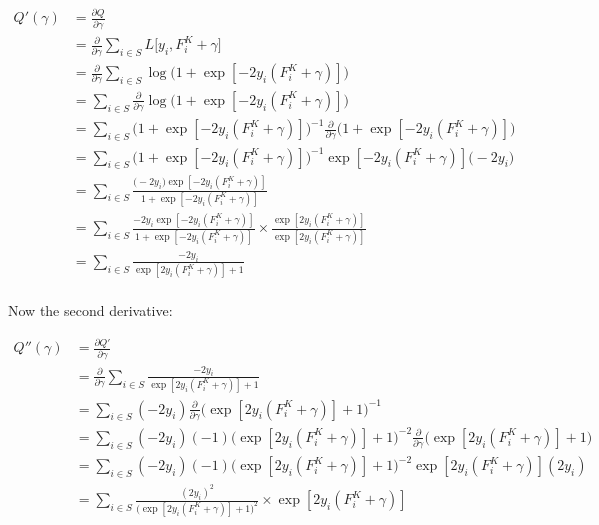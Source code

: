 \documentclass{article}
\begin{document}
\begin{equation*}
\begin{split}
Q'(\gamma) &= \frac {\partial Q}{\partial \gamma} \\
&= \frac{\partial}{\partial \gamma} \sum_{i \in S} L \bigg[ y_i, F_i^K + \gamma \bigg] \\
&= \frac{\partial}{\partial \gamma} \sum_{i \in S} \log \big( 1 + \exp [ -2 y_i (F_i^K + \gamma) ] \big) \\
&= \sum_{i \in S} \frac{\partial}{\partial \gamma} \log \big( 1 + \exp [ -2 y_i (F_i^K + \gamma) ] \big) \\
&= \sum_{i \in S} \big( 1 + \exp [ -2 y_i (F_i^K + \gamma) ] \big)^{-1} \frac{\partial}{\partial \gamma} \big( 1 + \exp [ -2 y_i (F_i^K + \gamma) ] \big) \\
&= \sum_{i \in S} \big( 1 + \exp [ -2 y_i (F_i^K + \gamma) ] \big)^{-1}  \exp [ -2 y_i (F_i^K + \gamma) ] \big( -2 y_i \big) \\
&= \sum_{i \in S} \frac{  \big( -2 y_i \big) \exp [ -2 y_i (F_i^K + \gamma) ] } { 1 + \exp [ -2 y_i (F_i^K + \gamma) ] } \\
&= \sum_{i \in S} \frac{  -2 y_i \exp [ -2 y_i (F_i^K + \gamma) ] } { 1 + \exp [ -2 y_i (F_i^K + \gamma) ] } \times
   \frac { \exp [ 2 y_i (F_i^K + \gamma) ] } { \exp [ 2 y_i (F_i^K + \gamma) ] } \\
&= \sum_{i \in S} \frac{ -2 y_i } { \exp [ 2 y_i (F_i^K + \gamma) ] + 1 } \\
\end{split}
\end{equation*}

Now the second derivative:

\begin{equation*}
\begin{split}
Q''(\gamma) &= \frac {\partial Q'}{\partial \gamma} \\
&= \frac {\partial}{\partial \gamma} \sum_{i \in S} \frac{ -2 y_i } { \exp [ 2 y_i (F_i^K + \gamma) ] + 1 } \\
&= \sum_{i \in S} (-2 y_i ) \frac {\partial}{\partial \gamma} \bigg( \exp [ 2 y_i (F_i^K + \gamma) ] + 1 \bigg)^{-1} \\
&= \sum_{i \in S} (-2 y_i ) (-1) \bigg( \exp [ 2 y_i (F_i^K + \gamma) ] + 1 \bigg)^{-2} \frac {\partial}{\partial \gamma} \bigg( \exp [ 2 y_i (F_i^K + \gamma) ] + 1 \bigg) \\
&= \sum_{i \in S} (-2 y_i ) (-1) \bigg( \exp [ 2 y_i (F_i^K + \gamma) ] + 1 \bigg)^{-2} \exp [ 2 y_i (F_i^K + \gamma) ] ( 2 y_i ) \\
&= \sum_{i \in S} \frac{ (2 y_i)^2 } { \bigg( \exp [ 2 y_i (F_i^K + \gamma) ] + 1 \bigg)^2 } \times \exp [ 2 y_i (F_i^K + \gamma) ] \\
\end{split}
\end{equation*}
\end{document}
